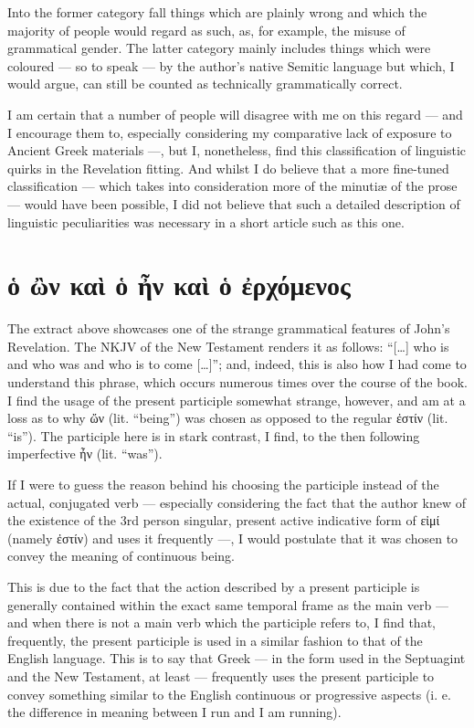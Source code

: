 Into the former category fall things which are plainly wrong and which the majority of people would regard as such, as, for example, the misuse of grammatical gender. The latter category mainly includes things which were coloured — so to speak — by the author’s native Semitic language but which, I would argue, can still be counted as technically grammatically correct.

I am certain that a number of people will disagree with me on this regard — and I encourage them to, especially considering my comparative lack of exposure to Ancient Greek materials —, but I, nonetheless, find this classification of linguistic quirks in the Revelation fitting. And whilst I do believe that a more fine-tuned classification — which takes into consideration more of the minutiæ of the prose — would have been possible, I did not believe that such a detailed description of linguistic peculiarities was necessary in a short article such as this one.

\section*{ὁ ὢν καὶ ὁ ἦν καὶ ὁ ἐρχόμενος}
  
The extract above showcases one of the strange grammatical features of John’s Revelation. The NKJV of the New Testament renders it as follows: “[…] who is and who was and who is to come […]”; and, indeed, this is also how I had come to understand this phrase, which occurs numerous times over the course of the book. I find the usage of the present participle somewhat strange, however, and am at a loss as to why ὤν (lit. “being”) was chosen as opposed to the regular ἐστίν (lit. “is”). The participle here is in stark contrast, I find, to the then following imperfective ἦν (lit. “was”).

If I were to guess the reason behind his choosing the participle instead of the actual, conjugated verb — especially considering the fact that the author knew of the existence of the 3rd person singular, present active indicative form of εἰμί (namely ἐστίν) and uses it frequently —, I would postulate that it was chosen to convey the meaning of continuous being.

This is due to the fact that the action described by a present participle is generally contained within the exact same temporal frame as the main verb — and when there is not a main verb which the participle refers to, I find that, frequently, the present participle is used in a similar fashion to that of the English language. This is to say that Greek — in the form used in the Septuagint and the New Testament, at least — frequently uses the present participle to convey something similar to the English continuous or progressive aspects (i. e. the difference in meaning between I run and I am running).

